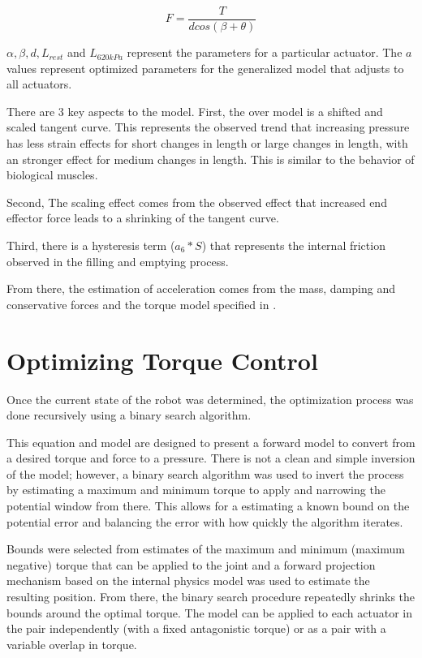 \begin{equation}
F = \dfrac{T}{d cos(\beta + \theta)}
\end{equation}

$\alpha, \beta, d, L_{rest}$ and $L_{620 kPa}$ represent the parameters for a 
particular actuator. The $a$ values represent optimized parameters
for the generalized model that adjusts to all actuators.

There are 3 key aspects to the model. First, the over model is a shifted and 
scaled tangent curve. This represents the observed trend that increasing 
pressure has less strain effects for short changes in length or large changes in 
length, with an stronger effect for medium changes in length. This is similar to 
the behavior of biological muscles.

Second, The scaling effect comes from the observed
effect that increased end effector force leads to a shrinking of the tangent 
curve.

Third, there is a hysteresis term ($a_{6} * S$) that represents the internal
friction observed in the filling and emptying process.

From there, the estimation of acceleration comes from the mass, 
damping and conservative forces and the torque model specified in
.

\section{Optimizing Torque Control}

Once the current state of the robot was determined, the optimization process was 
done recursively using a binary search algorithm. 

This equation and model are designed to present a forward model to convert from 
a desired torque and force to a pressure. There is not a clean and simple 
inversion of the model; however, a binary search algorithm was used to invert 
the process by estimating a maximum and minimum torque to apply and narrowing the
potential window from there. This allows for a estimating a known bound on the 
potential error and balancing the error with how quickly the algorithm iterates.


Bounds were selected from estimates
of the maximum and minimum (maximum negative) torque that can be applied to the
joint and a forward projection mechanism based on the internal physics model was
used to estimate the resulting position. From there, the binary search procedure
repeatedly shrinks the bounds around the optimal torque. The model can be 
applied to each actuator in the pair independently (with a fixed antagonistic 
torque) or as a pair with a variable overlap in torque. 

